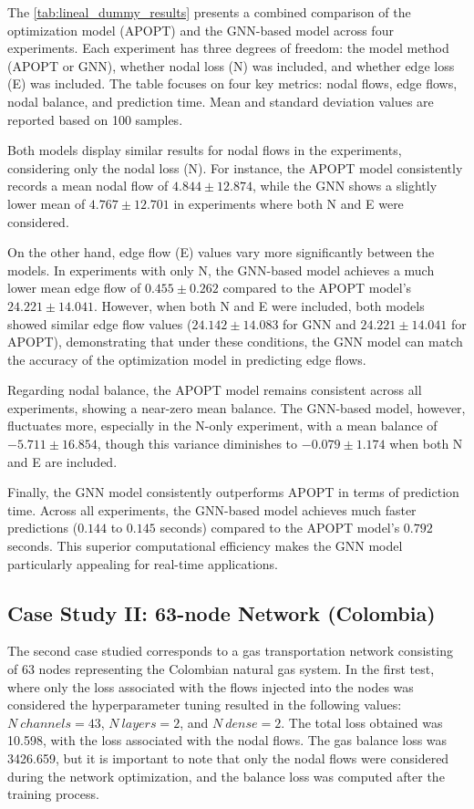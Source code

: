 The \cref{tab:lineal_dummy_results} presents a combined comparison of the optimization model (APOPT) and the GNN-based model across four experiments. Each experiment has three degrees of freedom: the model method (APOPT or GNN), whether nodal loss (N) was included, and whether edge loss (E) was included. The table focuses on four key metrics: nodal flows, edge flows, nodal balance, and prediction time. Mean and standard deviation values are reported based on 100 samples.


Both models display similar results for nodal flows in the experiments, considering only the nodal loss (N). For instance, the APOPT model consistently records a mean nodal flow of \(4.844 \pm 12.874\), while the GNN shows a slightly lower mean of \(4.767 \pm 12.701\) in experiments where both N and E were considered. 


On the other hand, edge flow (E) values vary more significantly between the models. In experiments with only N, the GNN-based model achieves a much lower mean edge flow of \(0.455 \pm 0.262\) compared to the APOPT model’s \(24.221 \pm 14.041\). However, when both N and E were included, both models showed similar edge flow values (\(24.142 \pm 14.083\) for GNN and \(24.221 \pm 14.041\) for APOPT), demonstrating that under these conditions, the GNN model can match the accuracy of the optimization model in predicting edge flows.


Regarding nodal balance, the APOPT model remains consistent across all experiments, showing a near-zero mean balance. The GNN-based model, however, fluctuates more, especially in the N-only experiment, with a mean balance of \(-5.711 \pm 16.854\), though this variance diminishes to \(-0.079 \pm 1.174\) when both N and E are included.

Finally, the GNN model consistently outperforms APOPT in terms of prediction time. Across all experiments, the GNN-based model achieves much faster predictions (\(0.144\) to \(0.145\) seconds) compared to the APOPT model’s \(0.792\) seconds. This superior computational efficiency makes the GNN model particularly appealing for real-time applications.




\subsection{Case Study II: 63-node Network (Colombia)}


The second case studied corresponds to a gas transportation network consisting of 63 nodes representing the Colombian natural gas system. In the first test, where only the loss associated with the flows injected into the nodes was considered the hyperparameter tuning resulted in the following values: $N \ channels = 43$, $N \ layers = 2$, and $N \ dense = 2$. The total loss obtained was 10.598, with the loss associated with the nodal flows. The gas balance loss was 3426.659, but it is important to note that only the nodal flows were considered during the network optimization, and the balance loss was computed after the training process.

